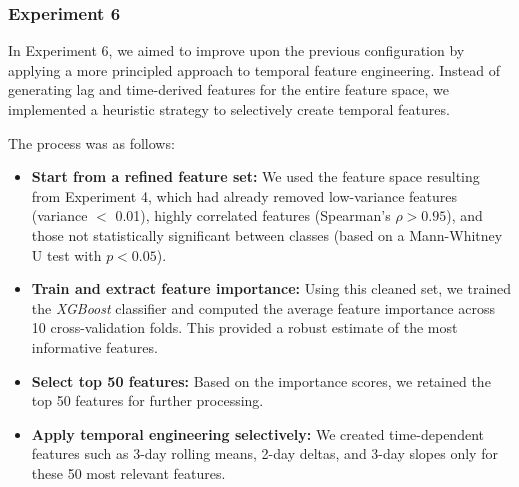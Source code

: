 \documentclass[12pt, a4paper]{report}
\begin{document}
\begin{table}[H]
\centering
\renewcommand{\arraystretch}{1.5} %
\normalsize %
\caption{Configuration 5 - Lag features}
\end{table}

\subsubsection{Experiment 6}
In Experiment 6, we aimed to improve upon the previous configuration by applying a more principled approach to temporal feature engineering. Instead of generating lag and time-derived features for the entire feature space, we implemented a heuristic strategy to selectively create temporal features.

The process was as follows:

\begin{itemize}
    \item \textbf{Start from a refined feature set:} We used the feature space resulting from Experiment 4, which had already removed low-variance features (variance $<$ 0.01), highly correlated features (Spearman's $\rho > 0.95$), and those not statistically significant between classes (based on a Mann-Whitney U test with $p < 0.05$).
    
    \item \textbf{Train and extract feature importance:} Using this cleaned set, we trained the \textit{XGBoost} classifier and computed the average feature importance across 10 cross-validation folds. This provided a robust estimate of the most informative features.
    
    \item \textbf{Select top 50 features:} Based on the importance scores, we retained the top 50 features for further processing.
    
    \item \textbf{Apply temporal engineering selectively:} We created time-dependent features such as 3-day rolling means, 2-day deltas, and 3-day slopes only for these 50 most relevant features. 
\end{itemize}
\end{document}

